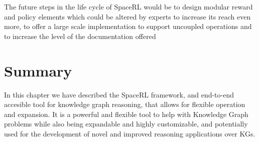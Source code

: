 The future steps in the life cycle of SpaceRL would be to design modular reward and policy elements which could be altered by experts to increase its reach even more, to offer a large scale implementation to support uncoupled operations and to increase the level of the documentation offered

\section{Summary}\label{sec:framework-summary}
In this chapter we have described the SpaceRL framework, and end-to-end accesible tool for knowledge graph reasoning, that allows for flexible operation and expansion. It is a powerful and flexible tool to help with Knowledge Graph problems while also being expandable and highly customizable, and potentially used for the development of novel and improved reasoning applications over KGs.